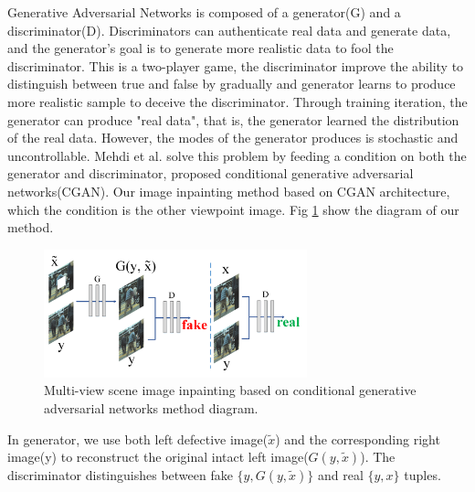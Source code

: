 \documentclass{IEEE_lsens}
\begin{document}
Generative Adversarial Networks \cite{Goodfellow2014::Generative} is composed of a generator(G) and a discriminator(D). Discriminators can authenticate real data and generate data, and the generator's goal is to generate more realistic data to fool the discriminator. This is a two-player game, the discriminator improve the ability to distinguish between true and false by gradually and generator learns to produce more realistic sample to deceive the discriminator. Through training iteration, the generator can produce "real data", that is, the generator learned the distribution of the real data.
However, the modes of the generator produces is stochastic and uncontrollable. Mehdi et al. \cite{Mirza2014:CS:Conditional} solve this problem by feeding a condition on both the generator and discriminator, proposed conditional generative adversarial networks(CGAN). Our image inpainting method based on CGAN architecture, which the condition is the other viewpoint image. Fig \ref{fig:CGAN} show the diagram of our method.
\begin{figure}[!t]
\centering
\includegraphics[width=3.0in]{CGAN}
\caption{Multi-view scene image inpainting based on conditional generative adversarial networks method diagram.}
\label{fig:CGAN}
\end{figure}
In generator, we use both left defective image($\tilde{x}$) and the corresponding right image(y) to reconstruct the original intact left image($G(y,\tilde{x})$). The discriminator distinguishes between fake $\{y, G(y,\tilde{x})\}$ and real $\{y, x\}$  tuples. 
\end{document}
